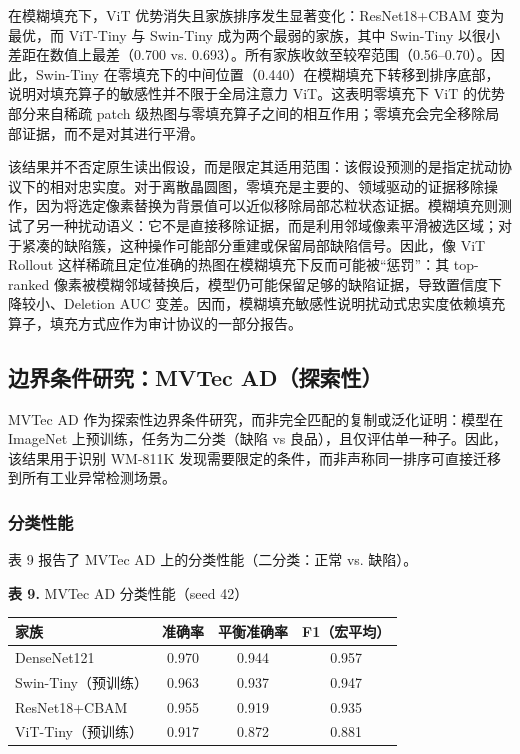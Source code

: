 \documentclass[11pt,a4paper]{article}
\begin{document}
在模糊填充下，ViT 优势消失且家族排序发生显著变化：ResNet18+CBAM 变为最优，而 ViT-Tiny 与 Swin-Tiny 成为两个最弱的家族，其中 Swin-Tiny 以很小差距在数值上最差（0.700 vs. 0.693）。所有家族收敛至较窄范围（0.56–0.70）。因此，Swin-Tiny 在零填充下的中间位置（0.440）在模糊填充下转移到排序底部，说明对填充算子的敏感性并不限于全局注意力 ViT。这表明零填充下 ViT 的优势部分来自稀疏 patch 级热图与零填充算子之间的相互作用；零填充会完全移除局部证据，而不是对其进行平滑。

该结果并不否定原生读出假设，而是限定其适用范围：该假设预测的是指定扰动协议下的相对忠实度。对于离散晶圆图，零填充是主要的、领域驱动的证据移除操作，因为将选定像素替换为背景值可以近似移除局部芯粒状态证据。模糊填充则测试了另一种扰动语义：它不是直接移除证据，而是利用邻域像素平滑被选区域；对于紧凑的缺陷簇，这种操作可能部分重建或保留局部缺陷信号。因此，像 ViT Rollout 这样稀疏且定位准确的热图在模糊填充下反而可能被“惩罚”：其 top-ranked 像素被模糊邻域替换后，模型仍可能保留足够的缺陷证据，导致置信度下降较小、Deletion AUC 变差。因而，模糊填充敏感性说明扰动式忠实度依赖填充算子，填充方式应作为审计协议的一部分报告。

\subsection{边界条件研究：MVTec AD（探索性）}

MVTec AD 作为探索性边界条件研究，而非完全匹配的复制或泛化证明：模型在 ImageNet 上预训练，任务为二分类（缺陷 vs 良品），且仅评估单一种子。因此，该结果用于识别 WM-811K 发现需要限定的条件，而非声称同一排序可直接迁移到所有工业异常检测场景。

\subsubsection{分类性能}

表 9 报告了 MVTec AD 上的分类性能（二分类：正常 vs. 缺陷）。

\begin{center}
\small \textbf{表 9.} MVTec AD 分类性能（seed 42）
\end{center}

\begin{tabular}{lccc}
\toprule
家族 & 准确率 & 平衡准确率 & F1（宏平均） \\
\midrule
DenseNet121 & 0.970 & 0.944 & 0.957 \\
Swin-Tiny（预训练） & 0.963 & 0.937 & 0.947 \\
ResNet18+CBAM & 0.955 & 0.919 & 0.935 \\
ViT-Tiny（预训练） & 0.917 & 0.872 & 0.881 \\
\bottomrule
\end{tabular}
\end{document}
